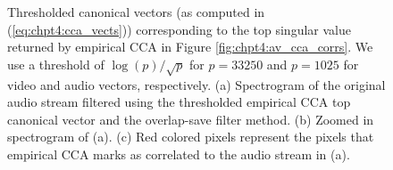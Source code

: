 \begin{figure}
  \begin{center}
    \caption{Thresholded canonical vectors (as computed in (\ref{eq:chpt4:cca_vects}))
      corresponding to the top singular value returned by empirical CCA in Figure
      \ref{fig:chpt4:av_cca_corrs}. We use a threshold of $\log(p)/\sqrt{p}$ for $p=33250$
      and $p=1025$ for video and audio vectors, respectively. (a) Spectrogram of the
      original audio stream filtered using the thresholded empirical CCA top canonical
      vector and the overlap-save filter method. (b) Zoomed in spectrogram of (a). (c) Red
      colored pixels represent the pixels that empirical CCA marks as correlated to the
      audio stream in (a).}
    \label{fig:chpt4:av_cca}
  \end{center}
\end{figure}

